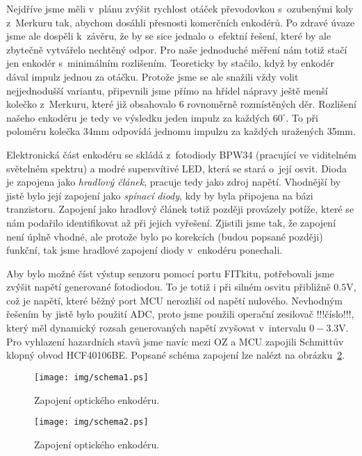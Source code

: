Nejdříve jsme měli v~plánu zvýšit rychlost otáček převodovkou s~ozubenými koly z~Merkuru tak, abychom dosáhli přesnosti komerčních enkodérů. Po zdravé úvaze jsme ale dospěli k~závěru, že by se sice jednalo o~efektní řešení, které by ale zbytečně vytvářelo nechtěný odpor. Pro naše jednoduché měření nám totiž stačí jen enkodér s~minimálním rozlišením. Teoreticky by stačilo, když by enkodér dával impulz jednou za otáčku. Protože jsme se ale snažili vždy volit nejjednodušší variantu, připevnili jsme přímo na hřídel nápravy ještě menší kolečko z~Merkuru, které již obsahovalo 6 rovnoměrně rozmístěných děr. Rozlišení našeho enkodéru je tedy ve výsledku jeden impulz za každých $60^\circ$. To při poloměru kolečka 34mm odpovídá jednomu impulzu za každých uražených 35mm.


Elektronická část enkodéru se skládá z~fotodiody BPW34 (pracující ve viditelném světelném spektru) a modré supersvítivé LED, která se stará o~její osvit. Dioda je zapojena jako \emph{hradlový článek}, pracuje tedy jako zdroj napětí. Vhodnější by jistě bylo její zapojení jako \emph{spínací diody}, kdy by byla připojena na bázi tranzistoru. Zapojení jako hradlový článek totiž později provázely potíže, které se nám podařilo identifikovat až při jejich vyřešení. Zjistili jsme tak, že zapojení není úplně vhodné, ale protože bylo po korekcích (budou popsané později) funkční, tak jsme hradlové zapojení diody v~enkodéru ponechali.

Aby bylo možné číst výstup senzoru pomocí portu FITkitu, potřebovali jsme zvýšit napětí generované fotodiodou. To je totiž i při silném osvitu přibližně $0.5$V, což je napětí, které běžný port MCU nerozliší od napětí nulového. Nevhodným řešením by jistě bylo použití ADC, proto jsme použili operační zesilovač !!!číslo!!!, který měl dynamický rozsah generovaných napětí zvyšovat v~intervalu $0-3.3$V. Pro vyhlazení hazardních stavů jsme navíc mezi OZ a MCU zapojili Schmittův klopný obvod HCF40106BE. Popsané schéma zapojení lze nalézt na obrázku~\ref{fig:schema1}.

\begin{figure}[h]
\centering
\texttt{[image: img/schema1.ps]}
\caption{Zapojení optického enkodéru.}
\label{fig:schema1}
\end{figure}

\begin{figure}[h]
\centering
\texttt{[image: img/schema2.ps]}
\caption{Zapojení optického enkodéru.}
\label{fig:schema1}
\end{figure}

